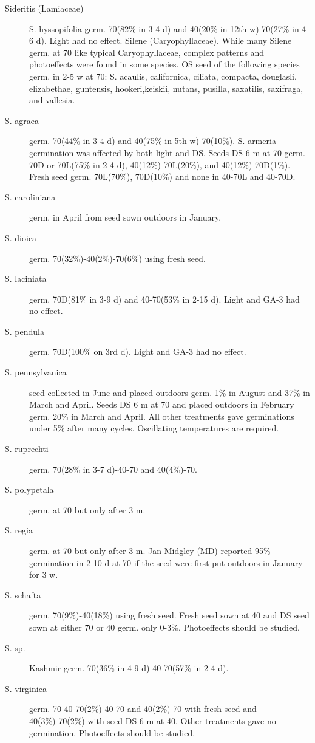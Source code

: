\begin{description}
\item[Sideritis (Lamiaceae)] S. hyssopifolia germ. 70(82\% in 3-4 d) and 40(20\%
in 12th w)-70(27\% in 4-6 d). Light had no effect.
Silene (Caryophyllaceae). While many Silene germ. at 70 like typical
Caryophyllaceae, complex patterns and photoeffects were found in some species. OS
seed of the following species germ. in 2-5 w at 70: S. acaulis, californica, ciliata,
compacta, douglasli, elizabethae, guntensis, hookeri,keiskii, nutans, pusilla, saxatilis,
saxifraga, and vallesia.
\item[S. agraea] germ. 70(44\% in 3-4 d) and 40(75\% in 5th w)-70(10\%).
S. armeria germination was affected by both light and DS. Seeds DS 6 m at 70
germ. 70D or 70L(75\% in 2-4 d), 40(12\%)-70L(20\%), and 40(12\%)-70D(1\%). Fresh
seed germ. 70L(70\%), 70D(10\%) and none in 40-70L and 40-70D.
\item[S. caroliniana] germ. in April from seed sown outdoors in January.
\item[S. dioica] germ. 70(32\%)-40(2\%)-70(6\%) using fresh seed.
\item[S. laciniata] germ. 70D(81\% in 3-9 d) and 40-70(53\% in 2-15 d). Light and GA-3
had no effect.
\item[S. pendula] germ. 70D(100\% on 3rd d). Light and GA-3 had no effect.
\item[S. pennsylvanica] seed collected in June and placed outdoors germ. 1\% in
August and 37\% in March and April. Seeds DS 6 m at 70 and placed outdoors in
February germ. 20\% in March and April. All other treatments gave germinations under
5\% after many cycles. Oscillating temperatures are required.
\item[S. ruprechti] germ. 70(28\% in 3-7 d)-40-70 and 40(4\%)-70.
\item[S. polypetala] germ. at 70 but only after 3 m.
\item[S. regia] germ. at 70 but only after 3 m. Jan Midgley (MD) reported 95\% germination
in 2-10 d at 70 if the seed were first put outdoors in January for 3 w.
\item[S. schafta] germ. 70(9\%)-40(18\%) using fresh seed. Fresh seed sown at 40 and
DS seed sown at either 70 or 40 germ. only 0-3\%. Photoeffects should be studied.
\item[S. sp.] Kashmir germ. 70(36\% in 4-9 d)-40-70(57\% in 2-4 d).
\item[S. virginica] germ. 70-40-70(2\%)-40-70 and 40(2\%)-70 with fresh seed and
40(3\%)-70(2\%) with seed DS 6 m at 40. Other treatments gave no germination.
Photoeffects should be studied.


\end{description}
